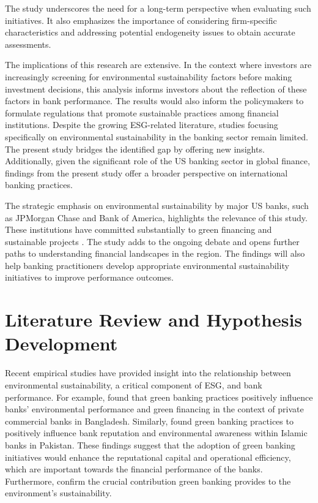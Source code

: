 \documentclass[11pt, a4paper]{article}
\begin{document}
The study underscores the need for a long-term perspective when evaluating such initiatives. It also emphasizes the importance of considering firm-specific characteristics and addressing potential endogeneity issues to obtain accurate assessments. 

The implications of this research are extensive. In the context where investors are increasingly screening for environmental sustainability factors before making investment decisions, this analysis informs investors about the reflection of these factors in bank performance. The results would also inform the policymakers to formulate regulations that promote sustainable practices among financial institutions. Despite the growing ESG-related literature, studies focusing specifically on environmental sustainability in the banking sector remain limited. The present study bridges the identified gap by offering new insights. Additionally, given the significant role of the US banking sector in global finance, findings from the present study offer a broader perspective on international banking practices.

The strategic emphasis on environmental sustainability by major US banks, such as JPMorgan Chase and Bank of America, highlights the relevance of this study. These institutions have committed substantially to green financing and sustainable projects \citep{JPMC2024, BoA2024}. The study adds to the ongoing debate and opens further paths to understanding financial landscapes in the region. The findings will also help banking practitioners develop appropriate environmental sustainability initiatives to improve performance outcomes.


\newpage
\section{Literature Review and Hypothesis Development}
Recent empirical studies have provided insight into the relationship between environmental sustainability, a critical component of ESG, and bank performance. For example, \cite{Chen2022} found that green banking practices positively influence banks' environmental performance and green financing in the context of private commercial banks in Bangladesh. Similarly, \cite{Khan2023b} found green banking practices to positively influence bank reputation and environmental awareness within Islamic banks in Pakistan. These findings suggest that the adoption of green banking initiatives would enhance the reputational capital and operational efficiency, which are important towards the financial performance of the banks. Furthermore, \cite{Gulzar2024} confirm the crucial contribution green banking provides to the environment's sustainability.
\end{document}
